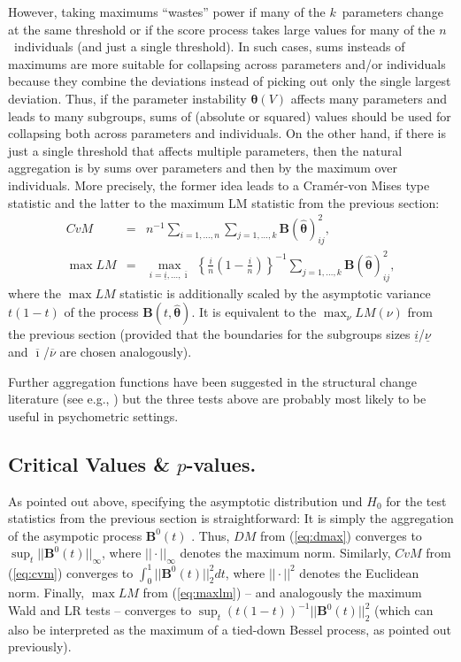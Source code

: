 \documentclass[man]{apa}
\begin{document}
However, taking maximums ``wastes'' power if many of the $k$~parameters change
at the same threshold or if the score process takes large values for
many of the $n$~individuals (and just a single threshold). In such
cases, sums insteads of maximums are more suitable for collapsing across
parameters and/or individuals because they combine the deviations instead of
picking out only the single largest deviation. Thus, if the parameter instability
${\bm \theta}(V)$ affects many parameters and leads to many subgroups, sums
of (absolute or squared) values should be used for collapsing both across
parameters and individuals. On the other hand, if there is just a single
threshold that affects multiple parameters, then the natural aggregation
is by sums over parameters and then by the maximum over individuals.
More precisely, the former idea leads to a Cram{\'e}r-von Mises type
statistic and the latter to the maximum LM statistic from the previous section:
\begin{eqnarray}
    \label{eq:cvm}
    \mathit{CvM}     & = & n^{-1} \sum_{i = 1,\dots, n} \sum_{j = 1, \dots, k} {\bm B}(\hat {\bm \theta})_{ij}^2, \\
    \label{eq:maxlm}
    \max \mathit{LM} & = & \max_{i = \underline{i}, \dots, \overline{\imath}} ~
      \left\{ \frac{i}{n} \left( 1 - \frac{i}{n} \right) \right\}^{-1}
      \sum_{j = 1, \dots, k} {\bm B}(\hat {\bm \theta})_{ij}^2,
\end{eqnarray}
where the $\max \mathit{LM}$ statistic is additionally scaled by the
asymptotic variance $t (1 - t)$ of the process ${\bm B}(t, \hat {\bm \theta})$.
It is equivalent to the $\max_\nu \mathit{LM}(\nu)$ from the previous
section (provided that the boundaries for the subgroups sizes $\underline{i}$/$\underline{\nu}$
and $\overline{\imath}$/$\overline{\nu}$ are chosen analogously).

Further aggregation functions have been suggested in the structural
change literature (see e.g., ) but the three
tests above are probably most likely to be useful in psychometric settings.




\subsection{Critical Values \& $p$-values.}

As pointed out above, specifying the asymptotic distribution und $H_0$ for the test
statistics from the previous section is straightforward: It is simply the aggregation
of the asympotic process ${\bm B}^0(t)$ \cite{HjoKon02,ZeiHor07}. Thus, $\mathit{DM}$
from (\ref{eq:dmax}) converges to $\sup_t || {\bm B}^0(t) ||_{\infty}$, where
$||\cdot||_\infty$ denotes the maximum norm. Similarly, $\mathit{CvM}$
from (\ref{eq:cvm}) converges to $\int_0^1 || {\bm B}^0(t) ||_2^2 d t$, where $||\cdot||^2$
denotes the Euclidean norm. Finally, $\max \mathit{LM}$ from (\ref{eq:maxlm}) -- and analogously
the maximum Wald and LR tests -- converges to $\sup_t (t (1-t))^{-1} || {\bm B}^0(t) ||_2^2$
(which can also be interpreted as the maximum of a tied-down Bessel process, as pointed out
previously).
\end{document}
